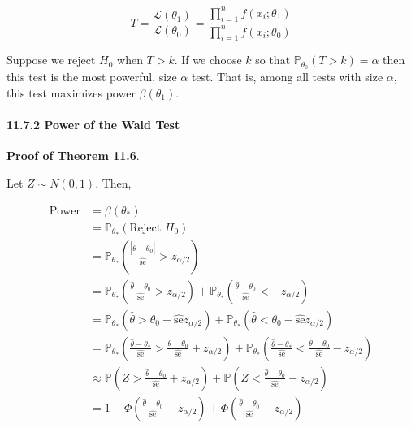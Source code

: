 \[ T = \frac{\mathcal{L}(\theta_{1})}{\mathcal{L}(\theta_{0})} = \frac{\prod_{i=1}^{n} f(x_{i}; \theta_{1})}{\prod_{i=1}^{n} f(x_{i}; \theta_{0})}\]

Suppose we reject \(H_{0}\) when \(T > k\). If we choose \(k\) so that
\(\mathbb{P}_{\theta_{0}}(T > k) = \alpha\) then this test is the most
powerful, size \(\alpha\) test. That is, among all tests with size
\(\alpha\), this test maximizes power \(\beta(\theta_{1})\).

\paragraph{11.7.2 Power of the Wald Test}\label{power-of-the-wald-test}

\textbf{Proof of Theorem 11.6}.

Let \(Z \sim N(0, 1)\). Then,

\begin{align*}
\text{Power} &= \beta(\theta_*) \\
&= \mathbb{P}_{\theta_*}(\text{Reject } H_{0}) \\
&= \mathbb{P}_{\theta_*}\left( \frac{|\hat{\theta} - \theta_{0}|}{\hat{\text{se}}} > z_{\alpha/2} \right) \\
&= \mathbb{P}_{\theta_*}\left( \frac{\hat{\theta} - \theta_{0}}{\hat{\text{se}}} > z_{\alpha/2} \right) 
+ \mathbb{P}_{\theta_*}\left( \frac{\hat{\theta} - \theta_{0}}{\hat{\text{se}}} < -z_{\alpha/2} \right) \\
&= \mathbb{P}_{\theta_*}(\hat{\theta} > \theta_{0} + \hat{\text{se}} z_{\alpha/2})
+ \mathbb{P}_{\theta_*}(\hat{\theta} < \theta_{0} - \hat{\text{se}} z_{\alpha/2}) \\
&= \mathbb{P}_{\theta_*}\left( \frac{\hat{\theta} - \theta_*}{\hat{\text{se}}} > \frac{\hat{\theta} - \theta_{0}}{\hat{\text{se}}} + z_{\alpha/2} \right) 
+ \mathbb{P}_{\theta_*}\left( \frac{\hat{\theta} - \theta_*}{\hat{\text{se}}} < \frac{\hat{\theta} - \theta_{0}}{\hat{\text{se}}} - z_{\alpha/2} \right) \\
& \approx \mathbb{P}\left(Z > \frac{\hat{\theta} - \theta_{0}}{\hat{\text{se}}} + z_{\alpha/2} \right) 
+ \mathbb{P}\left(Z < \frac{\hat{\theta} - \theta_{0}}{\hat{\text{se}}} - z_{\alpha/2} \right) \\
&= 1 - \Phi\left( \frac{\hat{\theta} - \theta_{0}}{\hat{\text{se}}} + z_{\alpha/2} \right) 
+ \Phi\left( \frac{\hat{\theta} - \theta_{0}}{\hat{\text{se}}} - z_{\alpha/2} \right)
\end{align*}


